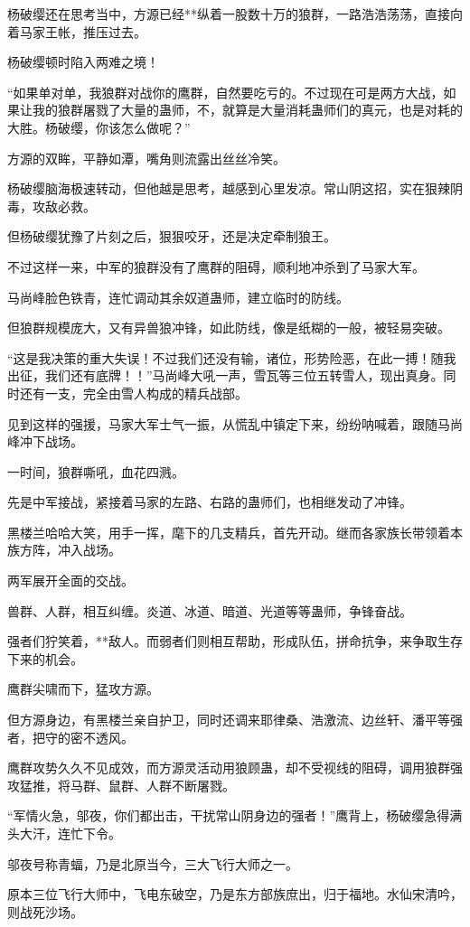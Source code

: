 \begin{this_body}
杨破缨还在思考当中，方源已经**纵着一股数十万的狼群，一路浩浩荡荡，直接向着马家王帐，推压过去。

杨破缨顿时陷入两难之境！

“如果单对单，我狼群对战你的鹰群，自然要吃亏的。不过现在可是两方大战，如果让我的狼群屠戮了大量的蛊师，不，就算是大量消耗蛊师们的真元，也是对耗的大胜。杨破缨，你该怎么做呢？”

方源的双眸，平静如潭，嘴角则流露出丝丝冷笑。

杨破缨脑海极速转动，但他越是思考，越感到心里发凉。常山阴这招，实在狠辣阴毒，攻敌必救。

但杨破缨犹豫了片刻之后，狠狠咬牙，还是决定牵制狼王。

不过这样一来，中军的狼群没有了鹰群的阻碍，顺利地冲杀到了马家大军。

马尚峰脸色铁青，连忙调动其余奴道蛊师，建立临时的防线。

但狼群规模庞大，又有异兽狼冲锋，如此防线，像是纸糊的一般，被轻易突破。

“这是我决策的重大失误！不过我们还没有输，诸位，形势险恶，在此一搏！随我出征，我们还有底牌！！”马尚峰大吼一声，雪瓦等三位五转雪人，现出真身。同时还有一支，完全由雪人构成的精兵战部。

见到这样的强援，马家大军士气一振，从慌乱中镇定下来，纷纷呐喊着，跟随马尚峰冲下战场。

一时间，狼群嘶吼，血花四溅。

先是中军接战，紧接着马家的左路、右路的蛊师们，也相继发动了冲锋。

黑楼兰哈哈大笑，用手一挥，麾下的几支精兵，首先开动。继而各家族长带领着本族方阵，冲入战场。

两军展开全面的交战。

兽群、人群，相互纠缠。炎道、冰道、暗道、光道等等蛊师，争锋奋战。

强者们狞笑着，**敌人。而弱者们则相互帮助，形成队伍，拼命抗争，来争取生存下来的机会。

鹰群尖啸而下，猛攻方源。

但方源身边，有黑楼兰亲自护卫，同时还调来耶律桑、浩激流、边丝轩、潘平等强者，把守的密不透风。

鹰群攻势久久不见成效，而方源灵活动用狼顾蛊，却不受视线的阻碍，调用狼群强攻猛推，将马群、鼠群、人群不断屠戮。

“军情火急，邬夜，你们都出击，干扰常山阴身边的强者！”鹰背上，杨破缨急得满头大汗，连忙下令。

邬夜号称青蝠，乃是北原当今，三大飞行大师之一。

原本三位飞行大师中，飞电东破空，乃是东方部族庶出，归于福地。水仙宋清吟，则战死沙场。


\end{this_body}
